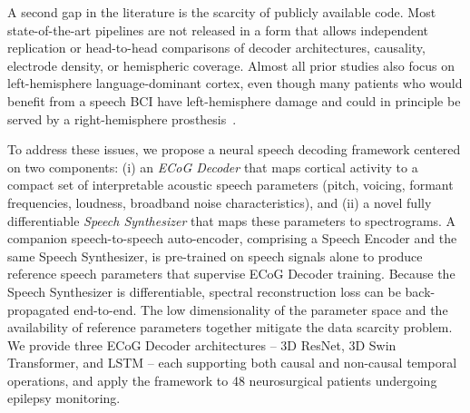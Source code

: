 A second gap in the literature is the scarcity of publicly available code. Most state-of-the-art pipelines are not released in a form that allows independent replication or head-to-head comparisons of decoder architectures, causality, electrode density, or hemispheric coverage. Almost all prior studies also focus on left-hemisphere language-dominant cortex, even though many patients who would benefit from a speech BCI have left-hemisphere damage and could in principle be served by a right-hemisphere prosthesis~\cite{lorach2023walking}.

To address these issues, we propose a neural speech decoding framework centered on two components: (i) an \emph{ECoG Decoder} that maps cortical activity to a compact set of interpretable acoustic speech parameters (pitch, voicing, formant frequencies, loudness, broadband noise characteristics), and (ii) a novel fully differentiable \emph{Speech Synthesizer} that maps these parameters to spectrograms. A companion speech-to-speech auto-encoder, comprising a Speech Encoder and the same Speech Synthesizer, is pre-trained on speech signals alone to produce reference speech parameters that supervise ECoG Decoder training. Because the Speech Synthesizer is differentiable, spectral reconstruction loss can be back-propagated end-to-end. The low dimensionality of the parameter space and the availability of reference parameters together mitigate the data scarcity problem. We provide three ECoG Decoder architectures -- 3D ResNet, 3D Swin Transformer, and LSTM -- each supporting both causal and non-causal temporal operations, and apply the framework to 48 neurosurgical patients undergoing epilepsy monitoring.

